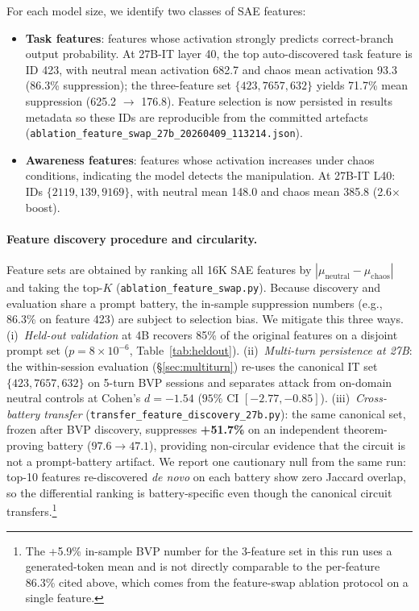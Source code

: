 \documentclass[10pt,twocolumn]{article}
\begin{document}
For each model size, we identify two classes of SAE features:
\begin{itemize}
    \item \textbf{Task features}: features whose activation strongly predicts correct-branch output probability. At 27B-IT layer 40, the top auto-discovered task feature is ID 423, with neutral mean activation 682.7 and chaos mean activation 93.3 (86.3\% suppression); the three-feature set $\{423, 7657, 632\}$ yields 71.7\% mean suppression (625.2 $\to$ 176.8). Feature selection is now persisted in results metadata so these IDs are reproducible from the committed artefacts (\texttt{ablation\_feature\_swap\_27b\_20260409\_113214.json}).
    \item \textbf{Awareness features}: features whose activation increases under chaos conditions, indicating the model detects the manipulation. At 27B-IT L40: IDs $\{2119, 139, 9169\}$, with neutral mean 148.0 and chaos mean 385.8 (2.6$\times$ boost).
\end{itemize}

\paragraph{Feature discovery procedure and circularity.}
Feature sets are obtained by ranking all 16K SAE features by $|\mu_{\text{neutral}} - \mu_{\text{chaos}}|$ and taking the top-$K$ (\texttt{ablation\_feature\_swap.py}).
Because discovery and evaluation share a prompt battery, the in-sample suppression numbers (e.g., 86.3\% on feature 423) are subject to selection bias.
We mitigate this three ways.
(i)~\emph{Held-out validation} at 4B recovers 85\% of the original features on a disjoint prompt set ($p = 8 \times 10^{-6}$, Table~\ref{tab:heldout}).
(ii)~\emph{Multi-turn persistence at 27B}: the within-session evaluation (\S\ref{sec:multiturn}) re-uses the canonical IT set $\{423, 7657, 632\}$ on 5-turn BVP sessions and separates attack from on-domain neutral controls at Cohen's $d = -1.54$ ($95\%$ CI $[-2.77, -0.85]$).
(iii)~\emph{Cross-battery transfer} (\texttt{transfer\_feature\_discovery\_27b.py}): the same canonical set, frozen after BVP discovery, suppresses \textbf{+51.7\%} on an independent theorem-proving battery ($97.6 \to 47.1$), providing non-circular evidence that the circuit is not a prompt-battery artifact.
We report one cautionary null from the same run: top-10 features re-discovered \emph{de novo} on each battery show zero Jaccard overlap, so the differential ranking is battery-specific even though the canonical circuit transfers.\footnote{The +5.9\% in-sample BVP number for the 3-feature set in this run uses a generated-token mean and is not directly comparable to the per-feature 86.3\% cited above, which comes from the feature-swap ablation protocol on a single feature.}
\end{document}
